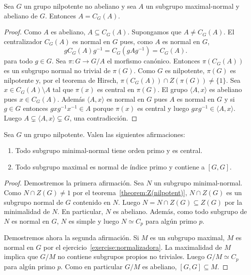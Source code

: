 \begin{corollary}
	Sea $G$ un grupo nilpotente no abeliano y sea $A$ un subgrupo
	maximal-normal y abeliano de $G$. Entonces $A=C_G(A)$.
\end{corollary}

\begin{proof}
	Como $A$ es abeliano, $A\subseteq C_G(A)$. Supongamos que $A\ne C_G(A)$.
	El centralizador $C_G(A)$ es normal en $G$ pues, como $A$ es normal en $G$, 
	\[
		gC_G(A)g^{-1}=C_G(gAg^{-1})=C_G(A).
	\]
	para todo $g\in G$.  Sea $\pi\colon G\to G/A$ el morfismo canónico.
	Entonces $\pi(C_G(A))$ es un subgrupo normal no trivial de $\pi(G)$. Como
	$G$ es nilpotente, $\pi(G)$ es nilpotente y, por el
	teorema de Hirsch, $\pi(C_G(A))\cap Z(\pi(G))\ne\{1\}$. Sea
	$x\in C_G(A)\setminus A$ tal que $\pi(x)$ es central en $\pi(G)$.  El grupo
	$\langle A,x\rangle$ es abeliano pues $x\in C_G(A)$. Además $\langle
	A,x\rangle$ es normal en $G$ pues $A$ es normal en $G$ y  si $g\in G$
	entonces $gxg^{-1}x^{-1}\in A$ porque $\pi(x)$ es central y luego
	$gxg^{-1}\in \langle A,x\rangle$. Luego $A\subsetneq \langle
	A,x\rangle\subsetneq G$, una contradicción.
\end{proof}

\begin{theorem}
	Sea $G$ un grupo nilpotente. Valen las siguientes afirmaciones:
	\begin{enumerate}
		\item Todo subgrupo minimal-normal tiene orden primo y es central.
		\item Todo subgrupo maximal es normal de índice primo y contiene a
			$[G,G]$. 
	\end{enumerate}
\end{theorem}

\begin{proof}
	Demostremos la primera afirmación. Sea $N$ un subgrupo minimal-normal. Como
	$N\cap Z(G)\ne1$ por el teorema~\ref{theorem:Z(nilpotent)}, $N\cap Z(G)$ es
	un subgrupo normal de $G$ contenido en $N$. Luego $N=N\cap Z(G)\subseteq
	Z(G)$ por la minimalidad de $N$. En particular, $N$ es abeliano. Además,
	como todo subgrupo de $N$ es normal en $G$, $N$ es simple y luego $N\simeq
	C_p$ para algún primo $p$.

	Demostremos ahora la segunda afirmación. Si $M$ es un subgrupo maximal, $M$
	es normal en $G$ por el ejercicio~\ref{exercise:normalizadora}. La
	maximalidad de $M$ implica que $G/M$ no contiene subgrupos propios no
	triviales. Luego $G/M\simeq C_p$ para algún primo $p$. Como en particular
	$G/M$ es abeliano, $[G,G]\subseteq M$. 
\end{proof}

